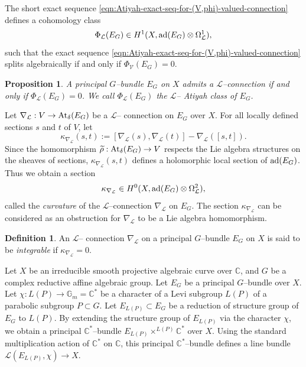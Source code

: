\documentclass[12pt,reqno]{amsart}
\DeclareMathOperator{\At}{{\rm At}}
\DeclareMathOperator{\ad}{{\rm ad}}
\newcommand{\mc}[1]{\mathcal{#1}}
\numberwithin{equation}{subsection}
\newtheorem{proposition}[equation]{Proposition}
\theoremstyle{definition}
\newtheorem{defn}[equation]{Definition}
\theoremstyle{theorem}
\begin{document}
The short exact sequence \eqref{eqn:Atiyah-exact-seq-for-(V,phi)-valued-connection} 
defines a cohomology class 
\begin{equation}\label{defn:V-valued-Atiyah-class-of-E_G}
	\Phi_{\mc L}(E_G) \in H^1(X, \ad(E_G)\otimes \Omega^{1}_{\mathcal{L}}), 
\end{equation}
such that the exact sequence \eqref{eqn:Atiyah-exact-seq-for-(V,phi)-valued-connection} 
splits algebraically if and only if $\Phi_{\mc V}(E_G) = 0$. 

\begin{proposition}\label{prop:E_G-admits-Lie-alg-conn-iff-Atiyah-cls-vanishes}\cite[\S\,2, Prop 2.2.9]{Ghosh-Paul-2025}
	A principal $G$--bundle $E_G$ on $X$ admits a $\mc L$--connection if and only if $\Phi_{\mc L}(E_G) = 0$. 
	We call $\Phi_{\mc L}(E_G)$ the {\it $\mc L$-- Atiyah class of $E_G$}. 
\end{proposition}

Let $\nabla_{\mathcal{L}} : V \to \At_{\delta}(E_G)$ be a $\mc L$-- connection 
on $E_G$ over $X$. For all locally defined sections $s$ and $t$ of $V$, let 
$$\kappa_{\nabla_{\mathcal{L}}}(s, t) := [\nabla_{\mathcal{L}}(s), \nabla_{\mathcal{L}}(t)] - \nabla_{\mathcal{L}}([s, t]).$$ 
Since the homomorphism $\widetilde{\rho} : \At_{\delta}(E_G) \to V$ respects the Lie algebra 
structures on the sheaves of sections, $\kappa_{\nabla_{\mathcal{L}}}(s, t)$ defines a holomorphic local 
section of $\ad(E_G)$. Thus we obtain a section 
$$\kappa_{\nabla_{\mathcal{L}}} \in H^0(X, \ad(E_G)\otimes \Omega^{2}_{\mathcal{L}}),$$
called the {\it curvature} of the $\mc L$--connection 
$\nabla_{\mathcal{L}}$ on $E_G$. The section $\kappa_{\nabla_{\mathcal{L}}}$ can be considered as an obstruction 
for $\nabla_{\mathcal{L}}$ to be a Lie algebra homomorphism. 

\begin{defn}
	An $\mc L$-- connection $\nabla_{\mathcal{L}}$ on a 
	principal $G$--bundle $E_G$ on $X$ is said to be {\it integrable} if $\kappa_{\nabla_{\mathcal{L}}} = 0$.
\end{defn}



Let $X$ be an irreducible smooth projective algebraic curve over $\mathbb{C}$, and $G$ be a complex reductive affine algebraic group. Let $E_{G}$ be a principal $G$--bundle over $X$. Let $\chi : L(P) \longrightarrow \mathbb{G}_{m} = \mathbb{C}^{*}$
be a character of a Levi subgroup $L(P)$ of a parabolic subgroup $P \subset G$. Let $ E_{L(P)} \subset E_{G}$ be a reduction of structure group of $E_{G}$ to $L(P)$. By extending the structure group of $E_{L(P)}$ via the character $\chi$, we obtain a principal $\mathbb{C}^{*}$--bundle $E_{L(P)} \times^{L(P)} \mathbb{C}^{*}$ over $X$. Using the standard multiplication action of $\mathbb{C}^{*}$ on $\mathbb{C}$, this principal $\mathbb{C}^{*}$--bundle defines a line bundle $\mathscr{L}(E_{L(P)}, \chi) \longrightarrow X$.
\end{document}
